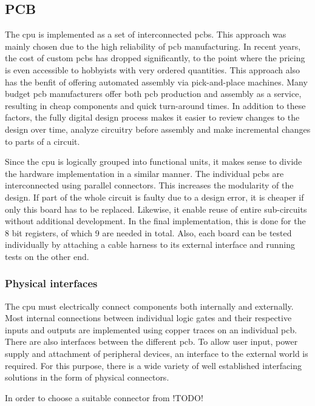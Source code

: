 \subsection{PCB}

The \ac{cpu} is implemented as a set of interconnected \acp{pcb}. This approach was mainly chosen due to the high reliability of \ac{pcb} manufacturing. In recent years, the cost of custom \acp{pcb} has dropped significantly, to the point where the pricing is even accessible to hobbyists with very ordered quantities. This approach also has the benfit of offering automated assembly via pick-and-place machines. Many budget \ac{pcb} manufacturers offer both \ac{pcb} production and assembly as a service, resulting in cheap components and quick turn-around times. In addition to these factors, the fully digital design process makes it easier to review changes to the design over time, analyze circuitry before assembly and make incremental changes to parts of a circuit.

Since the \ac{cpu} is logically grouped into functional units, it makes sense to divide the hardware implementation in a similar manner. The individual \acp{pcb} are interconnected using parallel connectors. This increases the modularity of the design. If part of the whole circuit is faulty due to a design error, it is cheaper if only this board has to be replaced. Likewise, it enable reuse of entire sub-circuits without additional development. In the final implementation, this is done for the 8 bit registers, of which 9 are needed in total. Also, each board can be tested individually by attaching a cable harness to its external interface and running tests on the other end.

\subsubsection{Physical interfaces}

The \ac{cpu} must electrically connect components both internally and externally. Most internal connections between individual logic gates and their respective inputs and outputs are implemented using copper traces on an individual \ac{pcb}. There are also interfaces between the different \ac{pcb}. To allow user input, power supply and attachment of peripheral devices, an interface to the external world is required. For this purpose, there is a wide variety of well established interfacing solutions in the form of physical connectors.

In order to choose a suitable connector from  !TODO!

